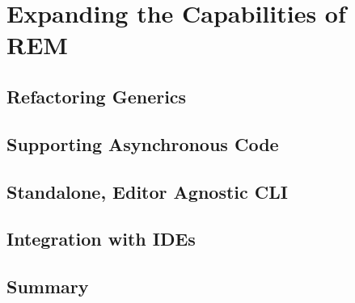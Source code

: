 \chapter{Expanding the Capabilities of REM}
\label{chap:expanding_rem}



\section{Refactoring Generics}
\label{sec:refactoring_generics}

\section{Supporting Asynchronous Code}
\label{sec:supporting_asynchronous_code}

\section{Standalone, Editor Agnostic CLI}
\label{sec:standalone_cli}

\section{Integration with IDEs}
\label{sec:integration_ides}

\section{Summary}
\label{sec:summary_2}